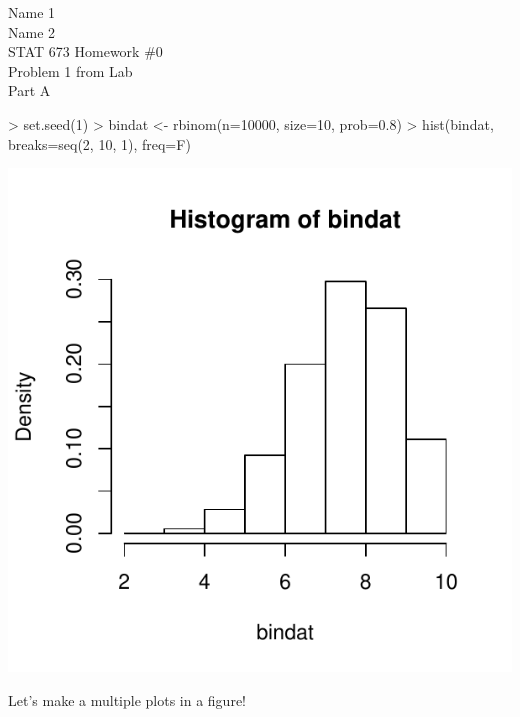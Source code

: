 \documentclass{article}
\begin{document}


\begin{flushleft}

Name 1\\
Name 2 \\
STAT 673 Homework \#0\\
\vspace*{2\baselineskip}
Problem 1 from Lab\\
Part A\\
\begin{Schunk}
\begin{Sinput}
> set.seed(1)
> bindat <- rbinom(n=10000, size=10, prob=0.8)
> hist(bindat, breaks=seq(2, 10, 1), freq=F)
\end{Sinput}
\end{Schunk}
\includegraphics{STAT673HW0-1a}

Let's make a multiple plots in a figure!


\end{flushleft}
\end{document}
